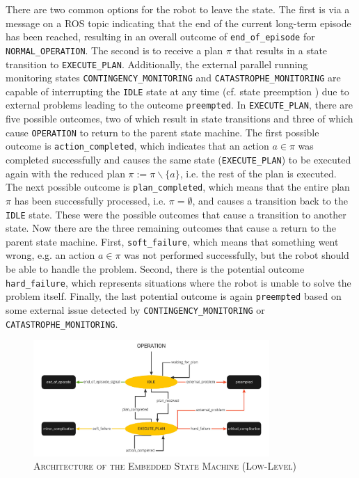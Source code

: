\documentclass[english, master, utf8]{base/thesis_KBS}
\newcommand{\code}[1]{\colorbox{light-gray}{\texttt{#1}}}
\begin{document}
There are two common options for the robot to leave the state. The first is via a message on a ROS topic indicating that the end of the current long-term episode
has been reached, resulting in an overall outcome of \code{end\_of\_episode} for \code{NORMAL\_OPERATION}. The second is to receive a plan $\pi$ that results in a state
transition to \code{EXECUTE\_PLAN}. Additionally, the external parallel running monitoring states \code{CONTINGENCY\_MONITORING} and \code{CATASTROPHE\_MONITORING}
are capable of interrupting the \code{IDLE} state at any time (cf. state preemption \cite{state_preemption}) due to external problems leading to the outcome \code{preempted}.
In \code{EXECUTE\_PLAN}, there are five possible outcomes, two of which result in state transitions and three of which cause \code{OPERATION} to return to the parent state machine.
The first possible outcome is \code{action\_completed}, which indicates that an action $a \in \pi$  was completed successfully and causes the same state (\code{EXECUTE\_PLAN}) to be
executed again with the reduced plan $\pi := \pi \backslash \{a\}$, i.e. the rest of the plan is executed. The next possible outcome is \code{plan\_completed}, which means that the entire
plan $\pi$ has been successfully processed, i.e. $\pi = \emptyset$, and causes a transition back to the \code{IDLE} state.
These were the possible outcomes that cause a transition to another state. Now there are the three remaining outcomes that cause a return to the parent state machine. 
First, \code{soft\_failure}, which means that something went wrong, e.g. an action $a \in \pi$ was not performed successfully, but the robot should be able to handle the problem. 
Second, there is the potential outcome \code{hard\_failure}, which represents situations where the robot is unable to solve the problem itself.
Finally, the last potential outcome is again \code{preempted} based on some external issue detected by \code{CONTINGENCY\_MONITORING} or \code{CATASTROPHE\_MONITORING}.
\begin{figure}[H]
    \centering
    \includegraphics[width=0.8\textwidth]{pics/SMACH_low_level.jpg}
    \caption{\textsc{Architecture of the Embedded State Machine (Low-Level)}}
    \label{fig:low_level_smach}
\end{figure}
\end{document}
